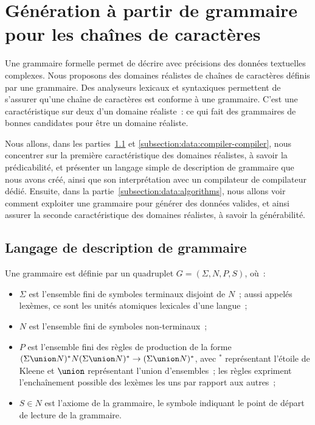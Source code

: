 \section{Génération à partir de grammaire pour les chaînes de caractères}
\label{section:data:strings}

Une grammaire formelle permet de décrire avec précisions des données textuelles
complexes. Nous proposons des domaines réalistes de chaînes de caractères
définis par une grammaire. Des analyseurs lexicaux et syntaxiques permettent de
s'assurer qu'une chaîne de caractères est conforme à une grammaire. C'est une
caractéristique sur deux d'un domaine réaliste~: ce qui fait des grammaires de
bonnes candidates pour être un domaine réaliste.

Nous allons, dans les parties~\ref{subsection:data:pp} et
\ref{subsection:data:compiler-compiler}, nous concentrer sur la première
caractéristique des domaines réalistes, à savoir la prédicabilité, et présenter
un langage simple de description de grammaire que nous avons créé, ainsi que son
interprétation avec un compilateur de compilateur dédié. Ensuite, dans la
partie~\ref{subsection:data:algorithms}, nous allons voir comment exploiter une
grammaire pour générer des données valides, et ainsi assurer la seconde
caractéristique des domaines réalistes, à savoir la générabilité.

\subsection{Langage de description de grammaire}
\label{subsection:data:pp}

\begin{definition}[Grammaire]

Une grammaire est définie par un quadruplet $G = (\Sigma, N, P, S)$, où~:
%
\begin{itemize}

\item $\Sigma$ est l'ensemble fini de {\strong symboles terminaux} disjoint de
$N$~; aussi appelés {\strong lexèmes}, ce sont les unités atomiques lexicales
d'une langue~;

\item $N$ est l'ensemble fini de {\strong symboles non-terminaux}~;

\item $P$ est l'ensemble fini des {\strong règles de production} de la forme
$(\Sigma \union N)^* N (\Sigma \union N)^* \rightarrow (\Sigma \union N)^*$,
avec $^*$ représentant l'étoile de Kleene et $\union$ représentant l'union
d'ensembles~; les règles expriment l'enchaînement possible des lexèmes les uns
par rapport aux autres~;

\item $S \in N$ est l'axiome de la grammaire, le symbole indiquant le point de
départ de lecture de la grammaire.

\end{itemize}

\end{definition}

